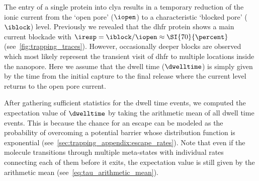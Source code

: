 The entry of a single protein into \gls{clya} results in a temporary reduction of the ionic current from the
`open pore' ($\iopen$) to a characteristic `blocked pore' ($\iblock$) level. Previously we revealed that the
\gls{dhfr} protein shows a main current blockade with $\iresp = \iblock / \iopen \approx \SI{70}{\percent}$
(see~\cref{fig:trapping_traces}). However, occasionally deeper blocks are observed which most likely represent
the transient visit of \gls{dhfr} to multiple locations inside the nanopore. Here we assume that the dwell
time ($\dwelltime$) is simply given by the time from the initial capture to the final release where the
current level returns to the open pore current.

After gathering sufficient statistics for the dwell time events, we computed the expectation value of
$\dwelltime$ by taking the arithmetic mean of all dwell time events. This is because the chance for an escape
can be modeled as the probability of overcoming a potential barrier whose distribution function is exponential
(see~\cref{sec:trapping_appendix:escape_rates}). Note that even if the molecule transitions through multiple
meta-states with individual rates connecting each of them before it exits, the expectation value is still
given by the arithmetic mean (see~\cref{eq:tau_arithmetic_mean}).


